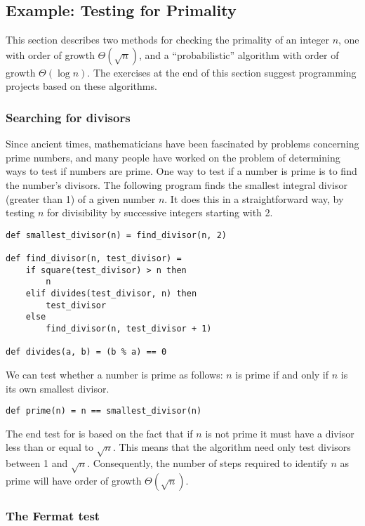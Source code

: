 \subsection{Example: Testing for Primality}

This section describes two methods for checking the primality of an integer $n$, one with order of growth $\Theta(\sqrt{n})$, and a ``probabilistic'' algorithm with order of growth $\Theta(\log n)$. The exercises at the end of this section suggest programming projects based on these algorithms.

\subsubsection{Searching for divisors}

Since ancient times, mathematicians have been fascinated by problems concerning prime numbers, and many people have worked on the problem of determining ways to test if numbers are prime. One way to test if a number is prime is to find the number's divisors. The following program finds the smallest integral divisor (greater than 1) of a given number $n$. It does this in a straightforward way, by testing $n$ for divisibility by successive integers starting with 2.

\begin{lstlisting}
def smallest_divisor(n) = find_divisor(n, 2)

def find_divisor(n, test_divisor) =
    if square(test_divisor) > n then
        n
    elif divides(test_divisor, n) then
        test_divisor
    else
        find_divisor(n, test_divisor + 1)

def divides(a, b) = (b % a) == 0
\end{lstlisting}

We can test whether a number is prime as follows: $n$ is prime if and only if $n$ is its own smallest divisor.

\begin{lstlisting}
def prime(n) = n == smallest_divisor(n)
\end{lstlisting}

The end test for  is based on the fact that if $n$ is not prime it must have a divisor less than or equal to $\sqrt{n}$. This means that the algorithm need only test divisors between 1 and $\sqrt{n}$. Consequently, the number of steps required to identify $n$ as prime will have order of growth $\Theta(\sqrt{n})$.

\subsubsection{The Fermat test}

